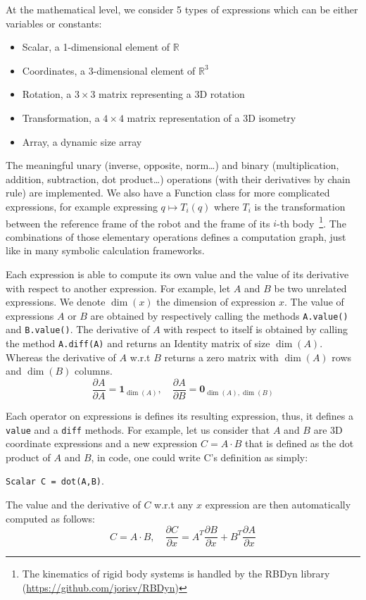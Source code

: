 At the mathematical level, we consider 5 types of expressions which can be either variables or constants:
\begin{itemize}
  \item Scalar, a 1-dimensional element of $\mathbb{R}$
  \item Coordinates, a 3-dimensional element of $\mathbb{R}^3$
  \item Rotation, a $3\times3$ matrix representing a 3D rotation
  \item Transformation, a $4\times4$ matrix representation of a 3D isometry
  \item Array, a dynamic size array
\end{itemize}
The meaningful unary (inverse, opposite, norm\ldots) and binary (multiplication, addition, subtraction, dot product\ldots) operations (with their derivatives by chain rule) are implemented.
We also have a Function class for more complicated expressions, for example expressing $q \mapsto T_i(q)$ where $T_i$ is the transformation between the reference frame of the robot and the frame of its $i$-th body~\footnote{The kinematics of rigid body systems is handled by the RBDyn library (\url{https://github.com/jorisv/RBDyn})}.
The combinations of those elementary operations defines a computation graph, just like in many symbolic calculation frameworks.

Each expression is able to compute its own value and the value of its derivative with respect to another expression.
For example, let $A$ and $B$ be two unrelated expressions.
We denote $\dim(x)$ the dimension of expression $x$.
The value of expressions $A$ or $B$ are obtained by respectively calling the methods {\tt A.value()} and {\tt B.value()}.
The derivative of $A$ with respect to itself is obtained by calling the method {\tt A.diff(A)} and returns an Identity matrix of size $\dim(A)$.
Whereas the derivative of $A$ w.r.t $B$ returns a zero matrix with $\dim(A)$ rows and $\dim(B)$ columns.
\begin{equation}\nonumber
  \frac{\partial A}{\partial A} = \mathbf{1}_{\dim(A)}, \quad \frac{\partial A}{\partial B} = \mathbf{0}_{\dim(A),\dim(B)}
\end{equation}

Each operator on expressions is defines its resulting expression, thus, it defines a {\tt value} and a {\tt diff} methods.
For example, let us consider that $A$ and $B$ are 3D coordinate expressions and a new expression $C = A\cdot B$ that is defined as the dot product of $A$ and $B$, in code, one could write C's definition as simply:
\begin{center}
{\tt Scalar C = dot(A,B)}.
\end{center}
The value and the derivative of $C$ w.r.t any $x$ expression are then automatically computed as follows:
\begin{equation}
\label{eq:dot}
  C = A\cdot B,\quad \frac{\partial C}{\partial x} = A^T\frac{\partial B}{\partial x} + B^T\frac{\partial A}{\partial x}
\end{equation}

